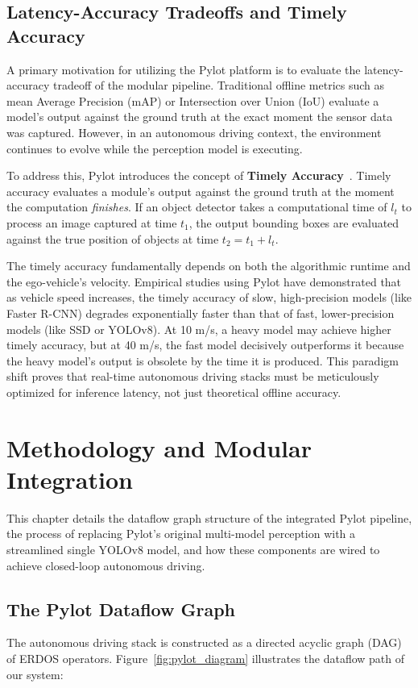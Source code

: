 \documentclass[11pt,a4paper]{report}
\begin{document}
\section{Latency-Accuracy Tradeoffs and Timely Accuracy}
\label{sec:timely_accuracy}
A primary motivation for utilizing the Pylot platform is to evaluate the latency-accuracy tradeoff of the modular pipeline. Traditional offline metrics such as mean Average Precision (mAP) or Intersection over Union (IoU) evaluate a model's output against the ground truth at the exact moment the sensor data was captured. However, in an autonomous driving context, the environment continues to evolve while the perception model is executing. 

To address this, Pylot introduces the concept of \textbf{Timely Accuracy}~\cite{erdos_pylot}. Timely accuracy evaluates a module's output against the ground truth at the moment the computation \textit{finishes}. If an object detector takes a computational time of $l_t$ to process an image captured at time $t_1$, the output bounding boxes are evaluated against the true position of objects at time $t_2 = t_1 + l_t$.

The timely accuracy fundamentally depends on both the algorithmic runtime and the ego-vehicle's velocity. Empirical studies using Pylot have demonstrated that as vehicle speed increases, the timely accuracy of slow, high-precision models (like Faster R-CNN) degrades exponentially faster than that of fast, lower-precision models (like SSD or YOLOv8). At 10 m/s, a heavy model may achieve higher timely accuracy, but at 40 m/s, the fast model decisively outperforms it because the heavy model's output is obsolete by the time it is produced. This paradigm shift proves that real-time autonomous driving stacks must be meticulously optimized for inference latency, not just theoretical offline accuracy.



\chapter{Methodology and Modular Integration}

This chapter details the dataflow graph structure of the integrated Pylot pipeline, the process of replacing Pylot's original multi-model perception with a streamlined single YOLOv8 model, and how these components are wired to achieve closed-loop autonomous driving.

\section{The Pylot Dataflow Graph}
\label{sec:dataflow_graph}
The autonomous driving stack is constructed as a directed acyclic graph (DAG) of ERDOS operators. Figure~\ref{fig:pylot_diagram} illustrates the dataflow path of our system:
\end{document}
